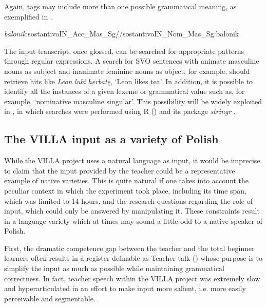 Again, tags may include more than one possible grammatical meaning, as exemplified in .

\ea%
    \label{ex:02:1}
    \textit{balonik}:sostantivoIN\_Acc\_Mas\_Sg//sostantivoIN\_Nom\_Mas\_Sg:balonik
    \z

The input transcript, once glossed, can be searched for appropriate patterns through regular expressions. A search for SVO sentences with animate masculine nouns as subject and inanimate feminine nouns as object, for example, should retrieve hits like \textit{Leon} \textit{lubi} \textit{herbatę}, ‘Leon likes tea’. In addition, it is possible to identify all the instances of a given lexeme or grammatical value such as, for example, ‘nominative masculine singular’. This possibility will be widely exploited in , in which searches were performed using R (\citealt{RCoreTeam2017}) and its package \textit{stringr} \citep{Wickham2017}.

\subsection{The VILLA input as a variety of Polish}\label{sec:02:1.3}

While the VILLA project uses a natural language as input, it would be imprecise to claim that the input provided by the teacher could be a representative example of native varieties. This is quite natural if one takes into account the peculiar context in which the experiment took place, including its time span, which was limited to 14 hours, and the research questions regarding the role of input, which could only be answered by manipulating it. These constraints result in a language variety which at times may sound a little odd to a native speaker of Polish. 

First, the dramatic competence gap between the teacher and the total beginner learners often results in a register definable as Teacher talk (\citealt[134–144]{Larsen-FreemanLong1991}) whose purpose is to simplify the input as much as possible while maintaining grammatical correctness. In fact, teacher speech within the VILLA project was extremely slow and hyperarticulated in an effort to make input more salient, i.e. more easily perceivable and segmentable. 

